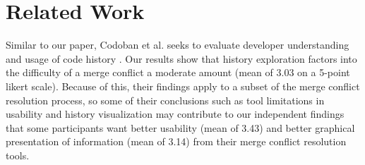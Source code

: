 \section{Related Work}\label{related_work}



Similar to our paper, Codoban et al. seeks to evaluate developer understanding and usage of code history \cite{mihai_lenses}. Our results show that history exploration factors into the difficulty of a merge conflict a moderate amount (mean of 3.03 on a 5-point likert scale). Because of this, their findings apply to a subset of the merge conflict resolution process, so some of their conclusions such as tool limitations in usability and history visualization may contribute to our independent findings that some participants want better usability (mean of 3.43) and better graphical presentation of information (mean of 3.14) from their merge conflict resolution tools.

